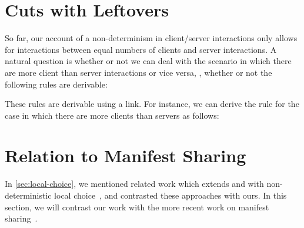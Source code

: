 \documentclass[envcountsame,UKenglish]{llncs}
\begin{document}
\section{Cuts with Leftovers}\label{sec:leftovers}
So far, our account of a non-determinism in client/server interactions only allows for interactions between equal numbers of clients and server interactions. A natural question is whether or not we can deal with the scenario in which there are more client than server interactions or vice versa, \ie, whether or not the following rules are derivable:
\begin{center}
  \begin{prooftree*}
  \end{prooftree*}
  \begin{prooftree*}
  \end{prooftree*}
\end{center}
These rules are derivable using a link. For instance, we can derive the rule for the case in which there are more clients than servers as follows:
\begin{prooftree}
\end{prooftree}

\section{Relation to Manifest Sharing}
In \cref{sec:local-choice}, we mentioned related work which extends \piDILL and \cp with non-deterministic local choice~\cite{atkey2016,caires2014,caires2017}, and contrasted these approaches with ours.
In this section, we will contrast our work with the more recent work on manifest sharing~\cite{balzer2017}.
\end{document}
